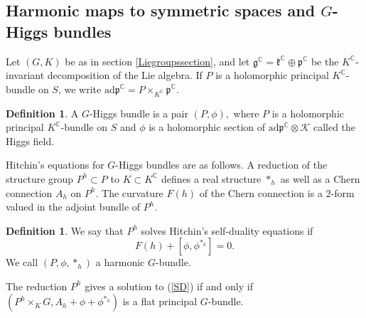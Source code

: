 \documentclass[10pt]{amsart}
\newcommand{\p}{\mathfrak{p}}
\newcommand{\g}{\mathfrak{g}}
\newcommand{\kk}{\mathfrak{k}}
\theoremstyle{definition}
\newtheorem{defn}[thm]{Definition}
\DeclareMathOperator{\C}{\mathbb{C}}
\begin{document}
\subsection{Harmonic maps to symmetric spaces and $G$-Higgs bundles}
Let $(G,K)$ be as in section \ref{Liegroupssection}, and let $\g^{\C} = \kk^{\C} \oplus\p^{\C}$ be the $K^{\C}$-invariant decomposition of the Lie algebra. If $P$ is a holomorphic principal $K^{\C}$-bundle on $S$, we write $\textrm{ad}\p^{\C} = P \times_{K^{\C}} \p^{\C}$.  

\begin{defn}\label{GHiggs}
A $G$-Higgs bundle is a pair $(P,\phi),$ where $P$ is a holomorphic principal $K^{\C}$-bundle on $S$ and $\phi$ is a holomorphic section of $\textrm{ad}\p^{\C}\otimes \mathcal{K}$ called the Higgs field. 
\end{defn}

Hitchin's equations for $G$-Higgs bundles are as follows. A reduction of the structure group $P^h\subset P$ to $K \subset K^{\C}$ defines a real structure $*_h$ as well as a Chern connection $A_h$ on $P^h$. The curvature $F(h)$ of the Chern connection is a $2$-form valued in the adjoint bundle of $P^h$.
\begin{defn}
    We say that $P^h$ solves Hitchin's self-duality equations if 
    \begin{equation}\label{SD}
        F(h) + [\phi,\phi^{*_h}]=0.
    \end{equation}
    We call $(P,\phi,*_h)$ a harmonic $G$-bundle.
\end{defn}
The reduction $P^h$ gives a solution to (\ref{SD}) if and only if  $(P^h \times_K G,A_h + \phi + \phi^{*_h})$ is a flat principal $G$-bundle.
\end{document}
